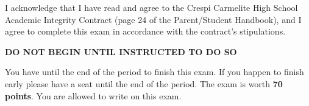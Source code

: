 \documentclass[addpoints,12pt]{exam}
\begin{document}
\begin{center}

\end{center}

\noindent I acknowledge that I have read and agree to the Crespi Carmelite High School Academic Integrity Contract (page 24 of the Parent/Student Handbook), and I agree to complete this exam in accordance with the contract's stipulations. 

\vspace{0.5in}

\vspace{.5 in}
\vspace{1in}

\noindent \textbf{DO NOT BEGIN UNTIL INSTRUCTED TO DO SO}

\noindent You have until the end of the period to finish this exam.  If you happen to finish early please have a seat until the end of the period. The exam is worth \textbf{70 points}. You are allowed to write on this exam.

\begin{center}
\combinedgradetable[h][questions]

\end{center}

\newpage
\end{document}
